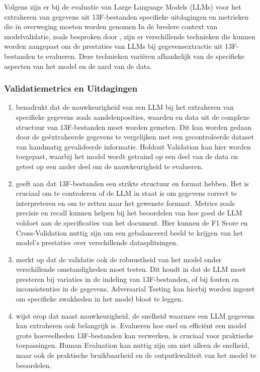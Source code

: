 Volgens \autocite{Huang2024} zijn er bij de evaluatie van Large Language Models (LLMs) voor het extraheren van gegevens uit 13F-bestanden specifieke uitdagingen en metrieken die in overweging moeten worden genomen
In de bredere context van modelvalidatie, zoals besproken door \textcite{Islam2024}, zijn er verschillende technieken die kunnen worden aangepast om de prestaties van LLMs bij gegevensextractie uit 13F-bestanden te evalueren. Deze technieken variëren afhankelijk van de specifieke aspecten van het model en de aard van de data.

\subsubsection{Validatiemetrics en Uitdagingen}
\label{sec:LLMValidation}

\begin{enumerate}
    \item \textcite{Islam2024} benadrukt dat de nauwkeurigheid van een LLM bij het extraheren van specifieke gegevens zoals aandelenposities, waarden en data uit de complexe structuur van 13F-bestanden moet worden gemeten. Dit kan worden gedaan door de geëxtraheerde gegevens te vergelijken met een gecontroleerde dataset van handmatig gevalideerde informatie. Holdout Validation kan hier worden toegepast, waarbij het model wordt getraind op een deel van de data en getest op een ander deel om de nauwkeurigheid te evalueren.
    \item \textcite{Islam2024} geeft aan dat 13F-bestanden een strikte structuur en format hebben. Het is cruciaal om te controleren of de LLM in staat is om gegevens correct te interpreteren en om te zetten naar het gewenste formaat. Metrics zoals precisie en recall kunnen helpen bij het beoordelen van hoe goed de LLM voldoet aan de specificaties van het document. Hier kunnen de F1 Score en Cross-Validation nuttig zijn om een gebalanceerd beeld te krijgen van het model's prestaties over verschillende datasplitsingen.
    \item \textcite{Islam2024} merkt op dat de validatie ook de robuustheid van het model onder verschillende omstandigheden moet testen. Dit houdt in dat de LLM moet presteren bij variaties in de indeling van 13F-bestanden, of bij fouten en inconsistenties in de gegevens. Adversarial Testing kan hierbij worden ingezet om specifieke zwakheden in het model bloot te leggen.
    \item \textcite{Islam2024} wijst erop dat naast nauwkeurigheid, de snelheid waarmee een LLM gegevens kan extraheren ook belangrijk is. Evalueren hoe snel en efficiënt een model grote hoeveelheden 13F-bestanden kan verwerken, is cruciaal voor praktische toepassingen. Human Evaluation kan nuttig zijn om niet alleen de snelheid, maar ook de praktische bruikbaarheid en de outputkwaliteit van het model te beoordelen.
\end{enumerate}


